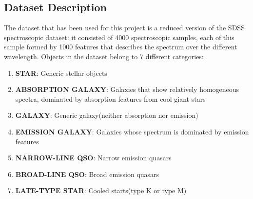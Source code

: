 \documentclass[a4paper,10pt]{article}
\begin{document}
  \subsection{Dataset Description}
    The dataset that has been used for this project is a reduced version of the SDSS spectroscopic dataset:
    it consisted of 4000 spectroscopic samples, each of this sample formed by 1000 features that describes 
    the spectrum over the different wavelength.\newline
    Objects in the dataset belong to 7 different categories:
    \begin{enumerate}
      \item \textbf{STAR}: Generic stellar objects
      \item \textbf{ABSORPTION GALAXY}: Galaxies that show relatively homogeneous spectra, dominated by absorption features from cool giant stars
      \item \textbf{GALAXY}: Generic galaxy(neither absorption nor emission)
      \item \textbf{EMISSION GALAXY}: Galaxies whose spectrum is dominated by emission features
      \item \textbf{NARROW-LINE QSO}: Narrow emission quasars
      \item \textbf{BROAD-LINE QSO}: Broad emission quasars
      \item \textbf{LATE-TYPE STAR}: Cooled starts(type K or type M)
    \end{enumerate}
  
\end{document}
